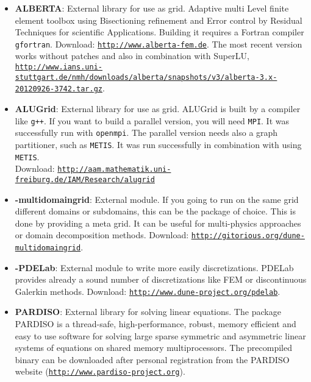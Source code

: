 \begin{itemize}
\item \textbf{ALBERTA}: External library for use as grid. Adaptive multi Level finite element toolbox using Bisectioning refinement and Error control by Residual Techniques for scientific Applications. Building it requires a Fortran compiler \texttt{gfortran}. Download: \texttt{\url{http://www.alberta-fem.de}}. The most recent version works without patches and also in combination with SuperLU, \texttt{\url{http://www.ians.uni-stuttgart.de/nmh/downloads/alberta/snapshots/v3/alberta-3.x-20120926-3742.tar.gz}}.

\item \textbf{ALUGrid}: External library for use as grid. ALUGrid is built by a \Cplusplus compiler like \texttt{g++}. If you want to build a parallel version, you will need \texttt{MPI}. It was successfully run with \texttt{openmpi}. The parallel version needs also a graph partitioner, such as \texttt{METIS}. It was run successfully in combination with \Dune using \texttt{METIS}. \\
Download: \texttt{\url{http://aam.mathematik.uni-freiburg.de/IAM/Research/alugrid}}

\item \textbf{\Dune-multidomaingrid}: External module. If you going to run on the same grid different domains or subdomains,
this can be the package of choice. This is done by providing a meta grid. It can be useful for multi-physics approaches or domain decomposition methods. Download: \texttt{\url{http://gitorious.org/dune-multidomaingrid}}. 

\item \textbf{\Dune-PDELab}: External module to write more easily discretizations. PDELab provides already a sound number of discretizations like FEM or discontinuous Galerkin methods. Download: \texttt{\url{http://www.dune-project.org/pdelab}}. 

\item \textbf{PARDISO}: External library for solving linear equations. The package PARDISO is a thread-safe, high-performance, robust, memory efficient and easy to use software for solving large sparse symmetric and asymmetric linear systems of equations on shared memory multiprocessors. The precompiled binary can be downloaded after personal registration from the PARDISO website (\texttt{\url{http://www.pardiso-project.org}}).


\end{itemize}
